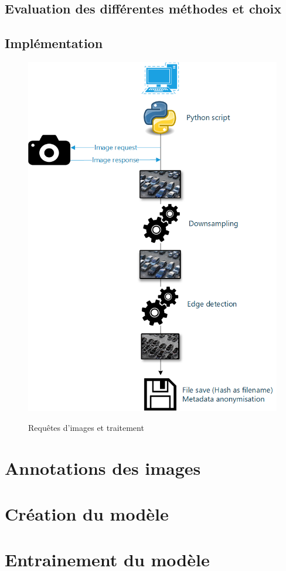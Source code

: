 \subsection{Evaluation des différentes méthodes et choix}
\subsection{Implémentation}
\begin{figure}[H]
    \includegraphics[width=130mm]{img/realisation/image_process.png}
    \label{fig:image_process}
    \centering
    \caption{Requêtes d'images et traitement}
\end{figure} 

\section{Annotations des images}

\section{Création du modèle}

\section{Entrainement du modèle}



